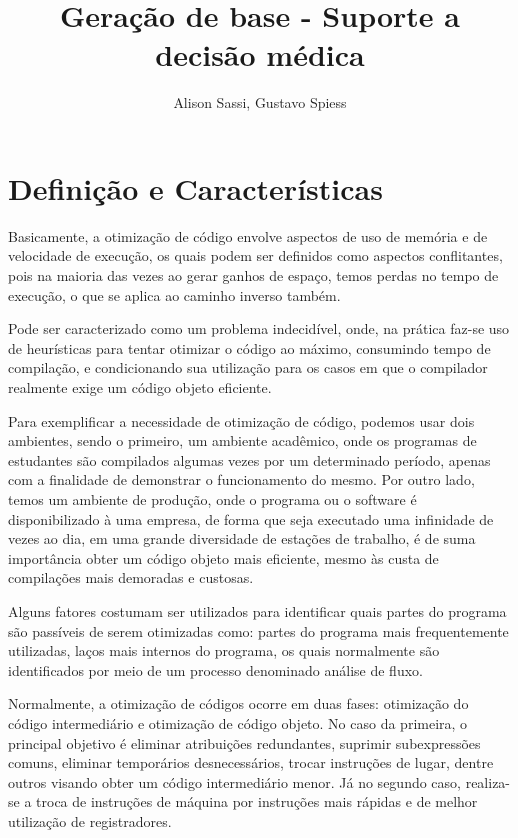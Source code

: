 \documentclass[12pt]{article}
\title{Geração de base - Suporte a decisão médica}
\author{Alison Sassi\inst{1}, Gustavo Spiess\inst{2} }
\begin{document}
 

\maketitle

\section{Definição e Características} 
Basicamente, a otimização de código envolve aspectos de uso de memória e de velocidade de execução, os quais podem ser definidos como aspectos conflitantes, pois na maioria das vezes ao gerar ganhos de espaço, temos perdas no tempo de execução, o que se aplica ao caminho inverso também.

Pode ser caracterizado como um problema indecidível, onde, na prática faz-se uso de heurísticas para tentar otimizar o código ao máximo, consumindo tempo de compilação, e condicionando sua utilização para os casos em que o compilador realmente exige um código objeto eficiente.\cite{lam2007compiladores} 

Para exemplificar a necessidade de otimização de código, podemos usar dois ambientes, sendo o primeiro, um ambiente acadêmico, onde os programas de estudantes são compilados algumas vezes por um determinado período, apenas com a finalidade de demonstrar o funcionamento do mesmo. Por outro lado, temos um ambiente de produção, onde o programa ou o software é disponibilizado à uma empresa, de forma que seja executado uma infinidade de vezes ao dia, em uma grande diversidade de estações de trabalho, é de suma importância obter um código objeto mais eficiente, mesmo às custa de compilações mais demoradas e custosas.

Alguns fatores costumam ser utilizados para identificar quais partes do programa são passíveis de serem otimizadas como: partes do programa mais frequentemente utilizadas, laços mais internos do programa, os quais normalmente são identificados por meio de um processo denominado análise de fluxo.

Normalmente, a otimização de códigos ocorre em duas fases: otimização do código intermediário e otimização de código objeto. No caso da primeira, o principal objetivo é eliminar atribuições redundantes, suprimir subexpressões comuns, eliminar temporários desnecessários, trocar instruções de lugar, dentre outros visando obter um código intermediário menor. Já no segundo caso, realiza-se a troca de instruções de máquina por instruções mais rápidas e de melhor utilização de registradores.\cite{lam2007compiladores}
\end{document}

